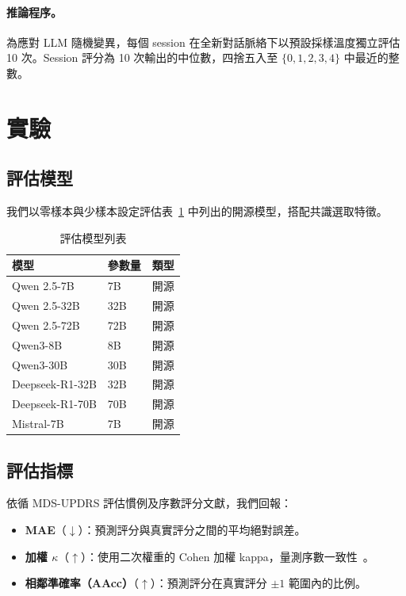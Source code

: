 \documentclass[12pt, a4paper]{article}
\begin{document}
\paragraph{推論程序。}
為應對 LLM 隨機變異，每個 session 在全新對話脈絡下以預設採樣溫度獨立評估 10 次。Session 評分為 10 次輸出的中位數，四捨五入至 $\{0,1,2,3,4\}$ 中最近的整數。


\section{實驗}

\subsection{評估模型}
我們以零樣本與少樣本設定評估表~\ref{tab:models} 中列出的開源模型，搭配共識選取特徵。

\begin{table}[htbp]
    \centering
    \caption{評估模型列表}
    \label{tab:models}
    \renewcommand{\arraystretch}{1.2}
    \begin{tabular}{lll}
        \toprule
        \textbf{模型} & \textbf{參數量} & \textbf{類型} \\
        \midrule
        Qwen 2.5-7B      & 7B  & 開源 \\
        Qwen 2.5-32B     & 32B & 開源 \\
        Qwen 2.5-72B     & 72B & 開源 \\
        Qwen3-8B         & 8B  & 開源 \\
        Qwen3-30B        & 30B & 開源 \\
        Deepseek-R1-32B  & 32B & 開源 \\
        Deepseek-R1-70B  & 70B & 開源 \\
        Mistral-7B       & 7B  & 開源 \\
        \bottomrule
    \end{tabular}
\end{table}

\subsection{評估指標}
依循 MDS-UPDRS 評估慣例及序數評分文獻，我們回報：
\begin{itemize}
    \item \textbf{MAE}（$\downarrow$）：預測評分與真實評分之間的平均絕對誤差。
    \item \textbf{加權 $\kappa$}（$\uparrow$）：使用二次權重的 Cohen 加權 kappa，量測序數一致性~\cite{vanbelle2016}。
    \item \textbf{相鄰準確率（AAcc）}（$\uparrow$）：預測評分在真實評分 $\pm 1$ 範圍內的比例。
\end{itemize}
\end{document}
